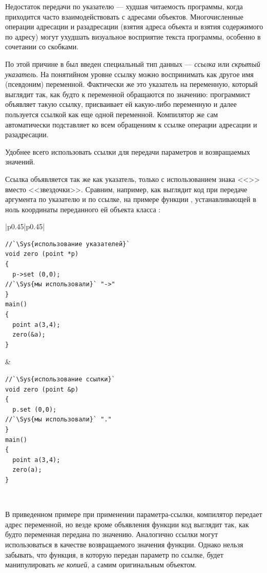 Недостаток передачи по указателю --- худшая читаемость программы, когда приходится часто взаимодействовать с адресами
объектов. Многочисленные операции адресации и разадресации (взятия адреса объекта и взятия содержимого по адресу) могут
ухудшать визуальное восприятие текста программы, особенно в сочетании со скобками. 

По этой причине в  был введен специальный тип данных --- \emph{ссылка} или 
\emph{скрытый указатель}. На понятийном уровне ссылку можно воспринимать как другое имя
(псевдоним) переменной. Фактически же это указатель на переменную, который выглядит так, как будто к переменной
обращаются по значению: программист объявляет такую ссылку, присваивает ей какую-либо переменную и далее пользуется
ссылкой как еще одной переменной. Компилятор же сам автоматически подставляет ко всем обращениям к ссылке операции
адресации и разадресации.

Удобнее всего использовать ссылки для передачи параметров и возвращаемых значений.

Ссылка объявляется так же как указатель, только с использованием знака <<\Sys{\&}>> вместо <<звездочки>>.
Сравним, например, как выглядит код при передаче аргумента по указателю и по ссылке, на примере функции
, устанавливающей в ноль координаты переданного ей объекта класса
:
\begin{center}
\begin{tabular}{|p{}|p{}|}
\hline
\begin{lstlisting}
//`\Sys{использование указателей}`
void zero (point *p) 
{
  p->set (0,0);
//`\Sys{мы использовали}` "->"
}
main() 
{
  point a(3,4);
  zero(&a);
}
\end{lstlisting}
&
\begin{lstlisting}
//`\Sys{использование ссылки}`
void zero (point &p) 
{
  p.set (0,0);
//`\Sys{мы использовали}` "."
}
main() 
{
  point a(3,4);
  zero(a);
}
\end{lstlisting}
\\\hline
\end{tabular}
\end{center}

В приведенном примере при применении параметра-ссылки, компилятор передает 
адрес переменной, но везде кроме объявления функции код выглядит так, как 
будто переменная передана по значению. Аналогично ссылки могут использоваться 
в качестве возвращаемого значения функции. Однако нельзя забывать, что функция, 
в которую передан параметр по ссылке, будет манипулировать \emph{не копией}, а самим 
оригинальным объектом.

